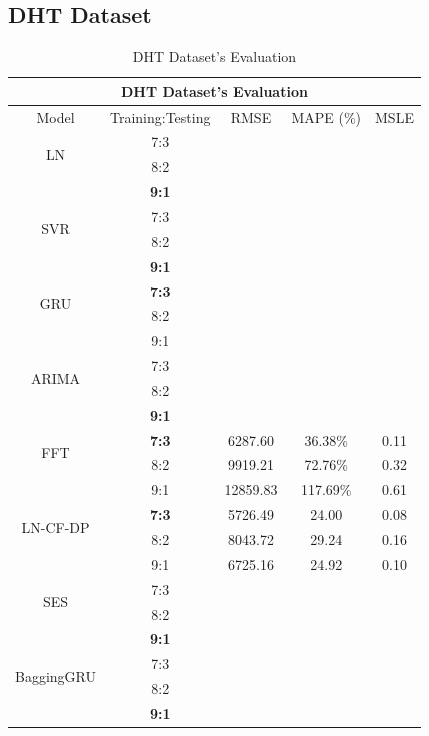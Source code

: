 \documentclass{ieeeojies}
\begin{document}
\subsection{DHT Dataset} 
\begin{table}[H]
    \centering
    \begin{tabular}{|c|c|c|c|c|}
         \hline
         \multicolumn{5}{|c|}{\textbf{DHT Dataset's Evaluation}}\\
         \hline
         \centering Model & Training:Testing & RMSE & MAPE (\%) & MSLE\\
         \hline
         \multirow{2}{*}{LN} & 7:3 & & & \\ & 8:2 & & & \\ & \textbf{9:1} & & & \\
         \hline
         \multirow{2}{*}{SVR} & 7:3&&&\\ & 8:2&&&\\ & \textbf{9:1} & & & \\
         \hline
         \multirow{2}{*}{GRU} & \textbf{7:3}	& & & \\ & 8:2 & & & \\ & 9:1 & & & \\
         \hline
         \multirow{2}{*}{ARIMA} & 7:3 &  &  & \\ & 8:2 &  & & \\ & \textbf{9:1} & & & \\
         \hline
         \multirow{2}{*}{FFT}& \textbf{7:3}	& 6287.60& 36.38\%& 0.11\\ & 8:2 & 9919.21& 72.76\%& 0.32\\ & 9:1 & 12859.83& 117.69\%&  0.61\\
         \hline
         \multirow{2}{*}{LN-CF-DP} & \textbf{7:3} & 5726.49&24.00&0.08 \\ & {8:2} &8043.72& 29.24& 0.16\\ & 9:1 &6725.16&24.92&0.10\\
         \hline
         \multirow{2}{*}{SES} & 7:3 & & & \\ & 8:2 & && \\ & \textbf{9:1} &  	&	& 	\\
         \hline
         \multirow{2}{*}{BaggingGRU} & 7:3 & &  &  \\ & 8:2 & &  &  \\ & \textbf{9:1} & & & \\
         \hline
    \end{tabular}
    \caption{DHT Dataset's Evaluation}
    \label{dhtresult}
\end{table}
\end{document}
